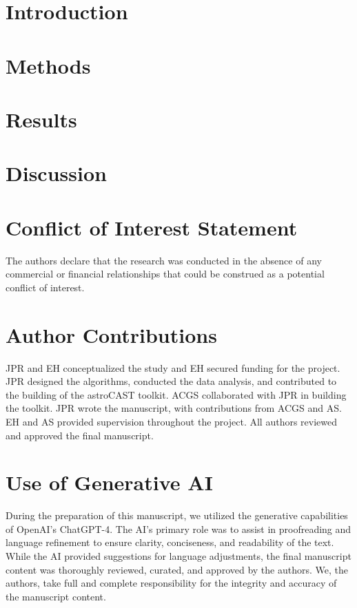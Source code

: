 \documentclass{article}
\begin{document}
    \section{Introduction}
    

    \section{Methods}
    

    \section{Results}
    

    
    
    
    


    \section{Discussion}
    
%
    \section*{Conflict of Interest Statement}
    The authors declare that the research was conducted in the absence of any commercial or financial relationships that could be construed as a potential conflict of interest.

    \section*{Author Contributions}
    JPR and EH conceptualized the study and EH secured funding for the project. JPR designed the algorithms, conducted the data analysis, and contributed to the building of the astroCAST toolkit. ACGS collaborated with JPR in building the toolkit. JPR wrote the manuscript, with contributions from ACGS and AS. EH and AS provided supervision throughout the project. All authors reviewed and approved the final manuscript.

    \section*{Use of Generative AI}
    During the preparation of this manuscript, we utilized the generative capabilities of OpenAI's ChatGPT-4. The AI's primary role was to assist in proofreading and language refinement to ensure clarity, conciseness, and readability of the text. While the AI provided suggestions for language adjustments, the final manuscript content was thoroughly reviewed, curated, and approved by the authors. We, the authors, take full and complete responsibility for the integrity and accuracy of the manuscript content.
\end{document}
